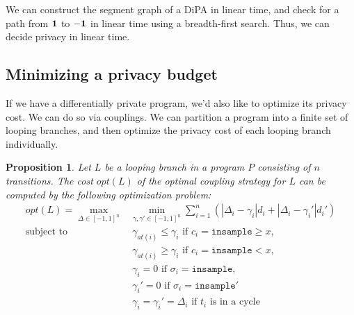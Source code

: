 \documentclass[12pt]{article}
\newcommand{\gguard}[1][x]{\texttt{insample}\geq #1}
\newcommand{\lguard}[1][x]{\texttt{insample} < #1}
\newtheorem{prop}[thm]{Proposition}
\theoremstyle{definition}
\begin{document}
We can construct the segment graph of a DiPA in linear time, and check for a path from $\bf 1$ to $\bf -1$ in linear time using a breadth-first search. Thus, we can decide privacy in linear time.

\subsection{Minimizing a privacy budget}

If we have a differentially private program, we'd also like to optimize its privacy cost. We can do so via couplings. We can partition a program into a finite set of looping branches, and then optimize the privacy cost of each looping branch individually.

\begin{prop}
    \label{prop:compute_opt_cost}
    Let $L$ be a looping branch in a program $P$ consisting of $n$ transitions. The cost $opt(L)$ of the optimal coupling strategy for $L$ can be computed by the following optimization problem: 
    \begin{align*}
        opt(L) = \max_{\Delta \in [-1, 1]^n} &\min_{\gamma, \gamma' \in [-1, 1]^n} \sum_{i = 1}^n \left(|\Delta_i - \gamma_i| d_i + |\Delta_i - \gamma_i'|d_i' \right)\\ 
            \text{subject to }
            &\ \gamma_{at(i)} \leq \gamma_i \text{ if } c_i = \gguard, \\
            &\ \gamma_{at(i)} \geq \gamma_i \text{ if } c_i = \lguard, \\
            &\ \gamma_i = 0 \text{ if } \sigma_i = \texttt{insample}, \\
            &\ \gamma_i' = 0 \text{ if } \sigma_i = \texttt{insample}'\\
            &\ \gamma_i = \gamma_i'= \Delta_i \text{ if } t_i \text{ is in a cycle}
    \end{align*}
\end{prop}
\end{document}
